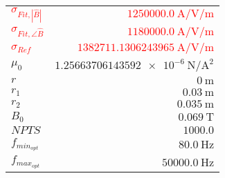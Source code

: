 
{%
    \begin{center}
    \label{tab:fitparams:st:freq:exact:opt}
    \begin{tabular}{lr}
    \toprule
        \textcolor{red}{$\sigma_{Fit,|\hat{B}|}$} & \textcolor{red}{$\SI{1250000.0}{\ampere\per\volt\per\meter}$}\\
        \textcolor{red}{$\sigma_{Fit,\angle\hat{B}}$} & \textcolor{red}{$\SI{1180000.0}{\ampere\per\volt\per\meter}$}\\
        \textcolor{red}{$\sigma_{Ref}$} & \textcolor{red}{$\SI{1382711.1306243965}{\ampere\per\volt\per\meter}$}\\
        $\mu_0$ & $\SI{1.25663706143592e-6}{\newton\per\ampere\squared}$\\
        $r$ & $\SI{0}{\meter}$\\
        $r_1$ & $\SI{0.03}{\meter}$\\
        $r_2$ & $\SI{0.035}{\meter}$\\
        $B_0$ & $\SI{0.069}{\tesla}$\\
        $NPTS$ & $\num{1000.0}$\\
        $f_{min_{opt}}$ & $\SI{80.0}{\hertz}$\\
        $f_{max_{opt}}$ & $\SI{50000.0}{\hertz}$\\

    \bottomrule
    \end{tabular}
    \end{center}
}

